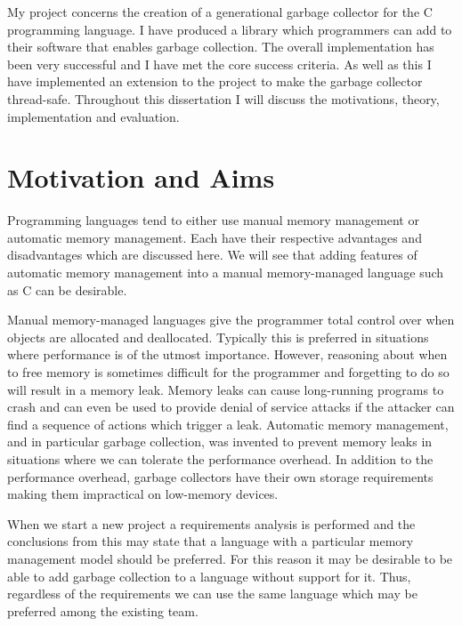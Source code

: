 \documentclass[../diss.tex]{subfiles}
\begin{document}
My project concerns the creation of a generational garbage collector for the C programming language. I have produced a library which programmers can add to their software that enables garbage collection. The overall implementation has been very successful and I have met the core success criteria. As well as this I have implemented an extension to the project to make the garbage collector thread-safe. Throughout this dissertation I will discuss the motivations, theory, implementation and evaluation.

\section{Motivation and Aims}

Programming languages tend to either use manual memory management or automatic memory management. Each have their respective advantages and disadvantages which are discussed here. We will see that adding features of automatic memory management into a manual memory-managed language such as C can be desirable.

Manual memory-managed languages give the programmer total control over when objects are allocated and deallocated. Typically this is preferred in situations where performance is of the utmost importance. However, reasoning about when to free memory is sometimes difficult for the programmer and forgetting to do so will result in a memory leak. Memory leaks can cause long-running programs to crash and can even be used to provide denial of service attacks if the attacker can find a sequence of actions which trigger a leak. Automatic memory management, and in particular garbage collection, was invented to prevent memory leaks in situations where we can tolerate the performance overhead. In addition to the performance overhead, garbage collectors have their own storage requirements making them impractical on low-memory devices.

When we start a new project a requirements analysis is performed and the conclusions from this may state that a language with a particular memory management model should be preferred. For this reason it may be desirable to be able to add garbage collection to a language without support for it. Thus, regardless of the requirements we can use the same language which may be preferred among the existing team. 
\end{document}
